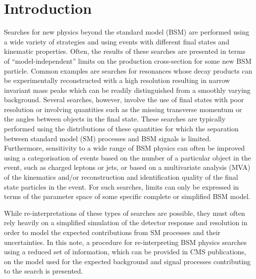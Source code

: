 \section{Introduction}
\label{sec:intro}

Searches for new physics beyond the standard model (BSM) are performed using a wide variety of 
strategies and using events with different final states and kinematic properties.  Often, 
the results of these searches are presented in terms of ``model-independent'' limits on the production 
cross-section for some new BSM particle. Common examples are searches for resonances whose decay products 
can be experimentally reconstructed with a high resolution resulting in narrow invariant mass peaks which can be readily distinguished from 
a smoothly varying background. Several searches, however, involve the use of final states with poor resolution or involving 
quantities such as the missing transverse momentum or the angles between objects in the final state. These searches are typically performed using the 
distributions of these quantities for which the separation between standard model (SM) processes and BSM signals is limited. Furthermore, 
sensitivity to a wide range of BSM physics can often be improved using a categorisation of events based on the number of a particular 
object in the event, such as charged leptons or jets, or based on a multivariate analysis (MVA) of the kinematics and/or reconstruction and 
identification quality of the final state particles in the event. For such searches, limits can only be expressed in terms of the 
parameter space of some specific complete or simplified BSM model.

While re-interpretations of these types of searches are possible, they must often rely heavily on a simplified simulation of 
the detector response and resolution in order to model the expected contributions from SM processes and their uncertainties. 
In this note, a procedure for re-interpreting BSM physics searches using a reduced set of information, which can be provided in CMS publications, 
on the model used for the expected background and signal processes contributing to the search is presented. 


